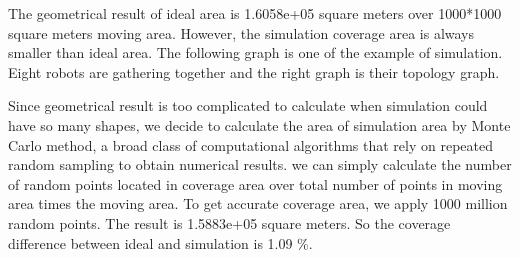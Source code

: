The geometrical result of ideal area is 1.6058e+05 square meters over 1000*1000 square meters moving area. However, the simulation coverage area is always smaller than ideal area.
The following graph is one of the example of simulation. Eight robots are gathering together and the right graph is their 
topology graph. 

Since geometrical result is too complicated to calculate when simulation could have so many shapes, we decide to calculate the area of simulation area by Monte Carlo method, a broad class of computational algorithms that rely on repeated random sampling to obtain numerical results. we can simply calculate the number of random points located in coverage area over total number of points in moving area times the moving area. To get accurate coverage area, we apply 1000 million random points. The result is 1.5883e+05 square meters. So the coverage difference between ideal and simulation is 1.09 \%.


